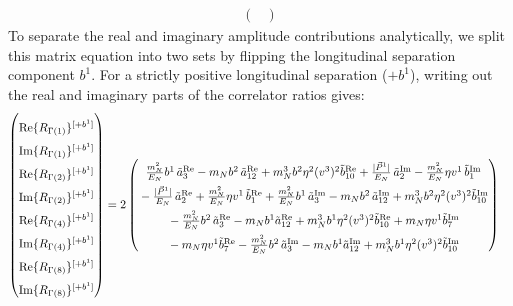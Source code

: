 \begin{widetext}
\begin{align}
\begin{pmatrix}
    \end{pmatrix}
\end{align}
To separate the real and imaginary amplitude contributions analytically, we split this matrix equation into two sets by flipping the longitudinal separation component $b^1$. For a strictly positive longitudinal separation ($+b^1$), writing out the real and imaginary parts of the correlator ratios gives:
\begin{align}
    \begin{pmatrix}
        \rule{0pt}{16pt} \text{Re}\{ R_{\Gamma(1)}\}^{[+b^1]} \\
        \rule{0pt}{16pt} \text{Im}\{ R_{\Gamma(1)}\}^{[+b^1]} \\
        \rule{0pt}{16pt} \text{Re}\{ R_{\Gamma(2)}\}^{[+b^1]} \\
        \rule{0pt}{16pt} \text{Im}\{ R_{\Gamma(2)}\}^{[+b^1]} \\
        \rule{0pt}{16pt} \text{Re}\{ R_{\Gamma(4)}\}^{[+b^1]} \\
        \rule{0pt}{16pt} \text{Im}\{ R_{\Gamma(4)}\}^{[+b^1]} \\
        \rule{0pt}{16pt} \text{Re}\{ R_{\Gamma(8)}\}^{[+b^1]} \\
        \rule{0pt}{16pt} \text{Im}\{ R_{\Gamma(8)}\}^{[+b^1]}
    \end{pmatrix} &= 2\begin{pmatrix}
     \rule{0pt}{16pt}   \frac{\mN^2}{E_N} \bvec^1\, \tilde a^{\text{Re}}_3-  \mN  \bvec^2 \, \tilde a^{\text{Re}}_{12}+  \mN^3  \bvec^2 \eta^2 (v^3)^2 \tilde b^{\text{Re}}_{10} +\frac{|\vec{P}^1|}{E_N}\, \tilde a^{\text{Im}}_2- \frac{\mN^2}{E_N} \eta v^1\, \tilde b^{\text{Im}}_1\\
      \rule{0pt}{16pt}  -\frac{|\vec{P}^1|}{E_N}\, \tilde a^{\text{Re}}_2+ \frac{\mN^2}{E_N} \eta v^1\, \tilde b^{\text{Re}}_1 + \frac{\mN^2}{E_N} \bvec^1\, \tilde a^{\text{Im}}_3-  \mN  \bvec^2 \, \tilde a^{\text{Im}}_{12}+  \mN^3  \bvec^2 \eta^2 (v^3)^2 \tilde b^{\text{Im}}_{10}\\
      \rule{0pt}{16pt}  -  \frac{\mN^2}{E_N} \bvec^2\, \tilde a^{\text{Re}}_3
		-  \mN   \bvec^1  \tilde a^{\text{Re}}_{12}+ \mN^3  \bvec^1 \eta^2 (v^3)^2 \tilde b^{\text{Re}}_{10}+\mN \eta v^1  \tilde b^{\text{Im}}_7 \\
      \rule{0pt}{16pt} - \mN \eta v^1  \tilde b^{\text{Re}}_7 -  \frac{\mN^2}{E_N} \bvec^2\, \tilde a^{\text{Im}}_3
		-  \mN   \bvec^1  \tilde a^{\text{Im}}_{12}+ \mN^3  \bvec^1 \eta^2 (v^3)^2 \tilde b^{\text{Im}}_{10}\\

\end{pmatrix}
\end{align}
\end{widetext}
